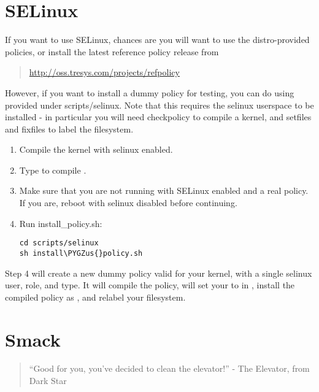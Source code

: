 \documentclass[a4paper,8pt,english]{sphinxmanual}
\def\PYGZus{\char`\_}
\begin{document}
\section{SELinux}
\label{admin-guide/LSM/SELinux:selinux}\label{admin-guide/LSM/SELinux::doc}
If you want to use SELinux, chances are you will want
to use the distro-provided policies, or install the
latest reference policy release from
\begin{quote}

\href{http://oss.tresys.com/projects/refpolicy}{http://oss.tresys.com/projects/refpolicy}
\end{quote}

However, if you want to install a dummy policy for
testing, you can do using  provided under
scripts/selinux.  Note that this requires the selinux
userspace to be installed - in particular you will
need checkpolicy to compile a kernel, and setfiles and
fixfiles to label the filesystem.
\begin{enumerate}
\item {} 
Compile the kernel with selinux enabled.

\item {} 
Type  to compile .

\item {} 
Make sure that you are not running with
SELinux enabled and a real policy.  If
you are, reboot with selinux disabled
before continuing.

\item {} 
Run install\_policy.sh:

\begin{Verbatim}[commandchars=\\\{\}]
cd scripts/selinux
sh install\PYGZus{}policy.sh
\end{Verbatim}

\end{enumerate}

Step 4 will create a new dummy policy valid for your
kernel, with a single selinux user, role, and type.
It will compile the policy, will set your  to
 in , install the compiled policy
as , and relabel your filesystem.


\section{Smack}
\label{admin-guide/LSM/Smack:smack}\label{admin-guide/LSM/Smack::doc}\begin{quote}

``Good for you, you've decided to clean the elevator!''
- The Elevator, from Dark Star
\end{quote}
\end{document}
